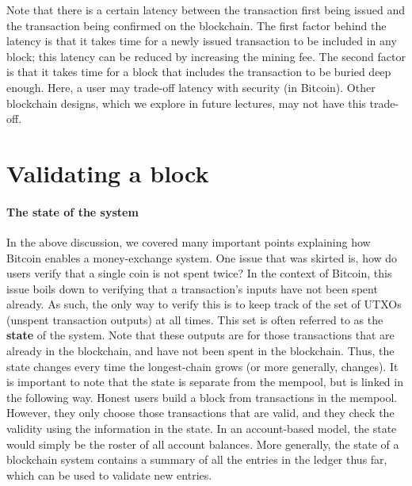 \documentclass{article}
\begin{document}
Note that there is a certain latency between the transaction first being issued and the transaction being confirmed on the blockchain. The first factor behind the latency is that it takes time for a newly issued transaction to be included in any block; this latency can be reduced by increasing the mining fee. The second factor is that it takes time for a block that includes the transaction to be buried deep enough. Here, a user may trade-off latency with security (in Bitcoin). Other blockchain designs, which we explore in future lectures, may not have this trade-off.

\section*{Validating a block}

\paragraph{The state of the system} In the above discussion, we covered many important points explaining how Bitcoin enables a money-exchange system. One issue that was skirted is, how do users verify that a single coin is not spent twice? In the context of Bitcoin, this issue boils down to verifying that a transaction's inputs have not been spent already. As such, the only way to verify this is to keep track of the set of UTXOs (unspent transaction outputs) at all times. This set is often referred to as the \textbf{state} of the system. Note that these outputs are for those transactions that are already in the blockchain, and have not been spent in the blockchain. Thus, the state changes  every time the longest-chain grows (or more generally, changes). It is important to note that the state is separate from the mempool, but is linked in the following way. Honest users build a block from transactions in the mempool. However, they only choose those transactions that are valid, and they check the validity using the information in the state. In an account-based model, the state would simply be the roster of all account balances. More generally, the state of a blockchain system contains a summary of all the entries in the ledger thus far, which can be used to validate new entries. 
\end{document}
